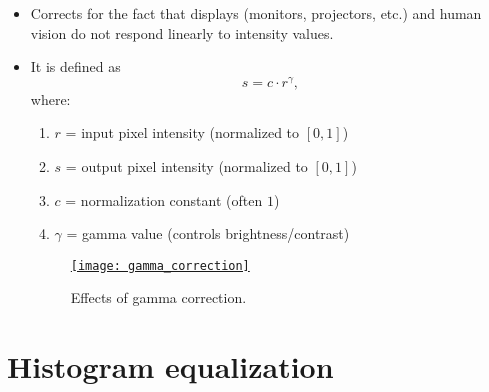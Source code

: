 \begin{itemize}
\item Corrects for the fact that displays (monitors, projectors, etc.) and
human vision do not respond linearly to intensity values.

\item It is defined as
\begin{equation}
s = c \cdot r^{\gamma},
\end{equation}
where:
\begin{enumerate}
\item $r$ = input pixel intensity (normalized to $[0,1]$)
\item $s$ = output pixel intensity (normalized to $[0,1]$)
\item $c$ = normalization constant (often $1$)
\item $\gamma$ = gamma value (controls brightness/contrast)
\end{enumerate}

\begin{figure}[H]
  \vspace{-0ex}
  \centering
  \href{https://github.com/vicente-gonzalez-ruiz/medical_imaging/blob/main/notebooks/gamma_correction.ipynb}{\texttt{[image: gamma\_correction]}}
  \caption{Effects of gamma correction.}
  \label{fig:gamma correction}
\end{figure}

\end{itemize}


\section{Histogram equalization}

